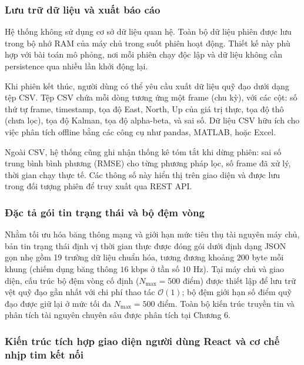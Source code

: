 \subsubsection{Lưu trữ dữ liệu và xuất báo cáo}

\hspace{0.5cm} Hệ thống không sử dụng cơ sở dữ liệu quan hệ. Toàn bộ dữ liệu phiên được lưu trong bộ nhớ RAM của máy chủ trong suốt phiên hoạt động. Thiết kế này phù hợp với bài toán mô phỏng, nơi mỗi phiên chạy độc lập và dữ liệu không cần persistence qua nhiều lần khởi động lại.

Khi phiên kết thúc, người dùng có thể yêu cầu xuất dữ liệu quỹ đạo dưới dạng tệp CSV. Tệp CSV chứa mỗi dòng tương ứng một frame (chu kỳ), với các cột: số thứ tự frame, timestamp, tọa độ East, North, Up của giá trị thực, tọa độ thô (chưa lọc), tọa độ Kalman, tọa độ alpha-beta, và sai số. Dữ liệu CSV hữu ích cho việc phân tích offline bằng các công cụ như pandas, MATLAB, hoặc Excel.

Ngoài CSV, hệ thống cũng ghi nhận thống kê tóm tắt khi dừng phiên: sai số trung bình bình phương (RMSE) cho từng phương pháp lọc, số frame đã xử lý, thời gian chạy thực tế. Các thông số này hiển thị trên giao diện và được lưu trong đối tượng phiên để truy xuất qua REST API.

\subsubsection{Đặc tả gói tin trạng thái và bộ đệm vòng}

\hspace{0.5cm} Nhằm tối ưu hóa băng thông mạng và giới hạn mức tiêu thụ tài nguyên máy chủ, bản tin trạng thái định vị thời gian thực được đóng gói dưới định dạng JSON gọn nhẹ gồm 19 trường dữ liệu chuẩn hóa, tương đương khoảng $200$ byte mỗi khung (chiếm dụng băng thông $16$ kbps ở tần số $10$ Hz). Tại máy chủ và giao diện, cấu trúc bộ đệm vòng cố định ($N_{\max} = 500$ điểm) được thiết lập để lưu trữ vệt quỹ đạo gần nhất với chi phí thao tác $\mathcal{O}(1)$; bộ đệm giới hạn số điểm quỹ đạo được giữ lại ở mức tối đa $N_{\max} = 500$ điểm. Toàn bộ kiến trúc truyền tin và phân tích tài nguyên chuyên sâu được phân tích tại Chương 6.

\subsubsection{Kiến trúc tích hợp giao diện người dùng React và cơ chế nhịp tim kết nối}

